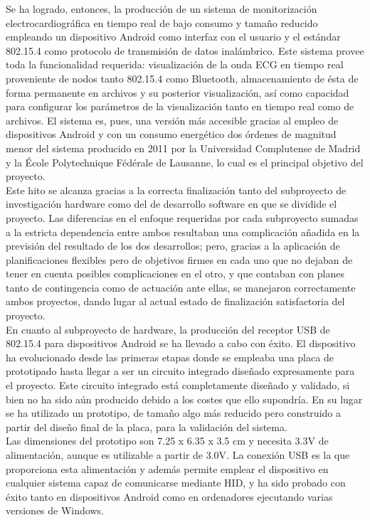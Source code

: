 	Se ha logrado, entonces, la producción de un sistema de monitorización electrocardiográfica en tiempo real de bajo consumo y tamaño reducido empleando un dispositivo Android como interfaz con el usuario y el estándar 802.15.4 como protocolo de transmisión de datos inalámbrico. Este sistema provee toda la funcionalidad requerida: visualización de la onda ECG en tiempo real proveniente de nodos tanto 802.15.4 como Bluetooth, almacenamiento de ésta de forma permanente en archivos y su posterior visualización, así como capacidad para configurar los parámetros de la visualización tanto en tiempo real como de archivos. El sistema es, pues, una versión más accesible gracias al empleo de dispositivos Android y con un consumo energético dos órdenes de magnitud menor del sistema producido en 2011 por la Universidad Complutense de Madrid y la École Polytechnique Fédérale de Lausanne, lo cual es el principal objetivo del proyecto.\\

	Este hito se alcanza gracias a la correcta finalización tanto del subproyecto de investigación hardware como del de desarrollo software en que se dividide el proyecto. Las diferencias en el enfoque requeridas por cada subproyecto sumadas a la estricta dependencia entre ambos resultaban una complicación añadida en la previsión del resultado de los dos desarrollos; pero, gracias a la aplicación de planificaciones flexibles pero de objetivos firmes en cada uno que no dejaban de tener en cuenta posibles complicaciones en el otro, y que contaban con planes tanto de contingencia como de actuación ante ellas, se manejaron correctamente ambos proyectos, dando lugar al actual estado de finalización satisfactoria del proyecto.\\

	En cuanto al subproyecto de hardware, la producción del receptor USB de 802.15.4 para dispositivos Android se ha llevado a cabo con éxito. El dispositivo ha evolucionado desde las primeras etapas donde se empleaba una placa de prototipado hasta llegar a ser un circuito integrado diseñado expresamente para el proyecto. Este circuito integrado está completamente diseñado y validado, si bien no ha sido aún producido debido a los costes que ello supondría. En su lugar se ha utilizado un prototipo, de tamaño algo más reducido pero construido a partir del diseño final de la placa, para la validación del sistema.\\

	Las dimensiones del prototipo son 7.25 x 6.35 x 3.5 cm y necesita 3.3V de alimentación, aunque es utilizable a partir de 3.0V. La conexión USB es la que proporciona esta alimentación y además permite emplear el dispositivo en cualquier sistema capaz de comunicarse mediante HID, y ha sido probado con éxito tanto en dispositivos Android como en ordenadores ejecutando varias versiones de Windows.\\

